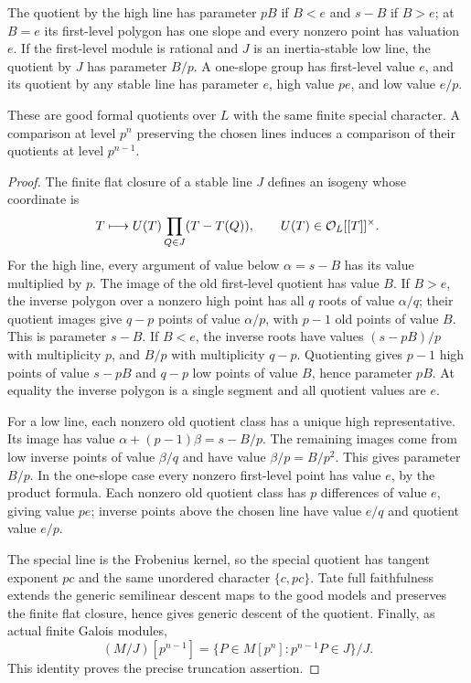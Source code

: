 \begin{lemma}\label{lem:actual-quotients}
The quotient by the high line has parameter $pB$ if $B<e$ and $s-B$ if $B>e$; at $B=e$ its first-level polygon has one slope and every nonzero point has valuation $e$. If the first-level module is rational and $J$ is an inertia-stable low line, the quotient by $J$ has parameter $B/p$. A one-slope group has first-level value $e$, and its quotient by any stable line has parameter $e$, high value $pe$, and low value $e/p$.

These are good formal quotients over $L$ with the same finite special character. A comparison at level $p^n$ preserving the chosen lines induces a comparison of their quotients at level $p^{n-1}$.
\end{lemma}
\begin{proof}
The finite flat closure of a stable line $J$ defines an isogeny whose coordinate is
\[
                T\longmapsto U(T)\prod_{Q\in J}(T-T(Q)),
                 \qquad U(T)\in\mathcal O_L[[T]]^\times.
\]
For the high line, every argument of value below $\alpha=s-B$ has its value multiplied by $p$. The image of the old first-level quotient has value $B$. If $B>e$, the inverse polygon over a nonzero high point has all $q$ roots of value $\alpha/q$; their quotient images give $q-p$ points of value $\alpha/p$, with $p-1$ old points of value $B$. This is parameter $s-B$. If $B<e$, the inverse roots have values $(s-pB)/p$ with multiplicity $p$, and $B/p$ with multiplicity $q-p$. Quotienting gives $p-1$ high points of value $s-pB$ and $q-p$ low points of value $B$, hence parameter $pB$. At equality the inverse polygon is a single segment and all quotient values are $e$.

For a low line, each nonzero old quotient class has a unique high representative. Its image has value $\alpha+(p-1)\beta=s-B/p$. The remaining images come from low inverse points of value $\beta/q$ and have value $\beta/p=B/p^2$. This gives parameter $B/p$. In the one-slope case every nonzero first-level point has value $e$, by the product formula. Each nonzero old quotient class has $p$ differences of value $e$, giving value $pe$; inverse points above the chosen line have value $e/q$ and quotient value $e/p$.

The special line is the Frobenius kernel, so the special quotient has tangent exponent $pc$ and the same unordered character $\{c,pc\}$. Tate full faithfulness extends the generic semilinear descent maps to the good models and preserves the finite flat closure, hence gives generic descent of the quotient. Finally, as actual finite Galois modules,
\[
 (M/J)[p^{n-1}]
       =\{P\in M[p^n]:p^{n-1}P\in J\}/J.
\]
This identity proves the precise truncation assertion.
\end{proof}

